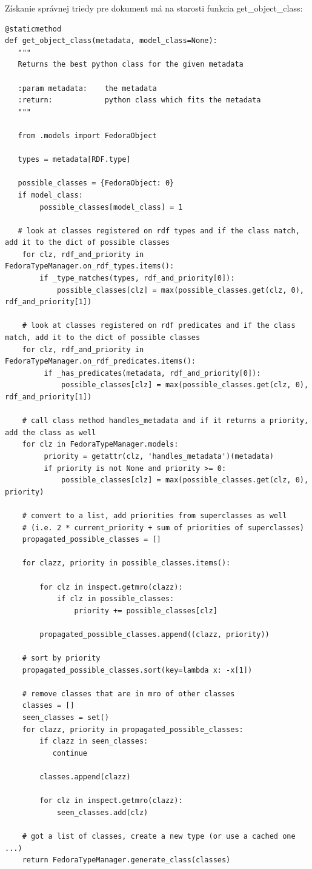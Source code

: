\documentclass[thesis=M,slovak]{FITthesis}[2013/05/06]
\begin{document}
Získanie správnej triedy pre dokument má na starosti funkcia get\_object\_class:
\begin{lstlisting}[frame=single] 
@staticmethod
def get_object_class(metadata, model_class=None):
   """
   Returns the best python class for the given metadata

   :param metadata:    the metadata
   :return:            python class which fits the metadata
   """

   from .models import FedoraObject

   types = metadata[RDF.type]

   possible_classes = {FedoraObject: 0}
   if model_class:
        possible_classes[model_class] = 1

   # look at classes registered on rdf types and if the class match, add it to the dict of possible classes
    for clz, rdf_and_priority in FedoraTypeManager.on_rdf_types.items():
        if _type_matches(types, rdf_and_priority[0]):
            possible_classes[clz] = max(possible_classes.get(clz, 0), rdf_and_priority[1])

    # look at classes registered on rdf predicates and if the class match, add it to the dict of possible classes
    for clz, rdf_and_priority in FedoraTypeManager.on_rdf_predicates.items():
         if _has_predicates(metadata, rdf_and_priority[0]):
             possible_classes[clz] = max(possible_classes.get(clz, 0), rdf_and_priority[1])

    # call class method handles_metadata and if it returns a priority, add the class as well
    for clz in FedoraTypeManager.models:
         priority = getattr(clz, 'handles_metadata')(metadata)
         if priority is not None and priority >= 0:
             possible_classes[clz] = max(possible_classes.get(clz, 0), priority)

    # convert to a list, add priorities from superclasses as well
    # (i.e. 2 * current_priority + sum of priorities of superclasses)
    propagated_possible_classes = []

    for clazz, priority in possible_classes.items():

        for clz in inspect.getmro(clazz):
            if clz in possible_classes:
                priority += possible_classes[clz]

        propagated_possible_classes.append((clazz, priority))

    # sort by priority
    propagated_possible_classes.sort(key=lambda x: -x[1])

    # remove classes that are in mro of other classes
    classes = []
    seen_classes = set()
    for clazz, priority in propagated_possible_classes:
        if clazz in seen_classes:
           continue

        classes.append(clazz)

        for clz in inspect.getmro(clazz):
            seen_classes.add(clz)

    # got a list of classes, create a new type (or use a cached one ...)
    return FedoraTypeManager.generate_class(classes)
\end{lstlisting}
\end{document}
